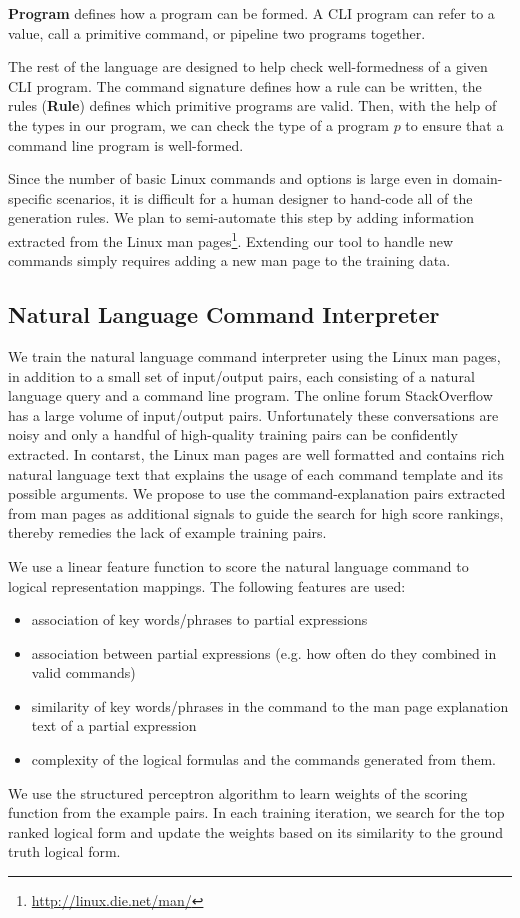 \textbf{Program} defines how a program can be formed. A CLI program can refer to a value, call a primitive command, or pipeline two programs together.

The rest of the language are designed to help check well-formedness of a given CLI program. The command signature defines how a rule can be written, the rules (\textbf{Rule}) defines which primitive programs are valid. Then, with the help of the types in our program, we can check the type of a program $p$ to ensure that a command line program is well-formed.

Since the number of basic Linux commands and options is large even in domain-specific scenarios, it is difficult for a human designer to hand-code all of the generation rules. We plan to semi-automate this step by adding information extracted from the Linux man pages\footnote{\url{http://linux.die.net/man/}}. Extending our tool to handle new commands simply requires adding a new man page to the training data.

\subsection{Natural Language Command Interpreter}
\label{subsec:parser}
We train the natural language command interpreter using the Linux man pages, in addition to a small set of input/output pairs, each consisting of a natural language query and a command line program. The online forum StackOverflow has a large volume of input/output pairs. Unfortunately these conversations are noisy and only a handful of high-quality training pairs can be confidently extracted. In contarst, the Linux man pages are well formatted and contains rich natural language text that explains the usage of each command template and its possible arguments. We propose to use the command-explanation pairs extracted from man pages as additional signals to guide the search for high score rankings, thereby remedies the lack of example training pairs.

We use a linear feature function to score the natural language command to logical representation mappings. The following features are used:
\begin{itemize}\itemsep-1pt
	\item association of key words/phrases to partial expressions
	\item association between partial expressions (e.g. how often do they combined in valid commands)
	\item similarity of key words/phrases in the command to the man page explanation text of a partial expression
	\item complexity of the logical formulas and the commands generated from them.
\end{itemize}
We use the structured perceptron algorithm to learn weights of the scoring function from the example pairs. In each training iteration, we search for the top ranked logical form and update the weights based on its similarity to the ground truth logical form.

